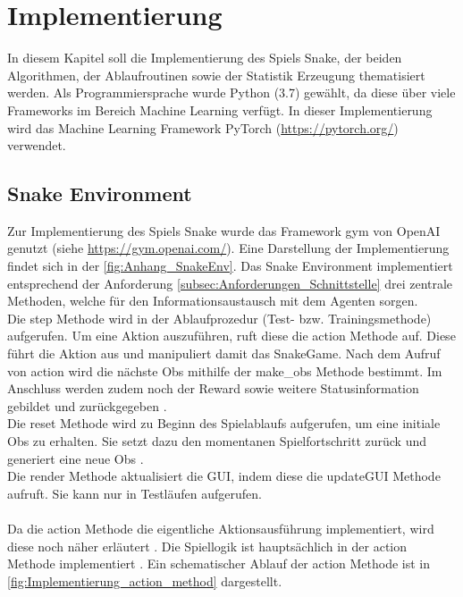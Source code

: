 \chapter{Implementierung} \label{chap:Implementierung}
In diesem Kapitel soll die Implementierung des Spiels Snake, der beiden Algorithmen, der Ablaufroutinen sowie der Statistik Erzeugung thematisiert werden. Als Programmiersprache wurde Python (3.7) gewählt, da diese über viele Frameworks im Bereich Machine Learning verfügt.
In dieser Implementierung wird das Machine Learning Framework PyTorch (\url{https://pytorch.org/}) verwendet.

\section{Snake Environment} \label{sec:Implementierung_Environment}
Zur Implementierung des Spiels Snake wurde das Framework gym von OpenAI genutzt (siehe \url{https://gym.openai.com/}). Eine Darstellung der Implementierung findet sich in der \autoref{fig:Anhang_SnakeEnv}. Das Snake Environment implementiert entsprechend der Anforderung \ref{subsec:Anforderungen_Schnittstelle} drei zentrale Methoden, welche für den Informationsaustausch mit dem Agenten sorgen.\\ 
Die step Methode  wird in der Ablaufprozedur (Test- bzw. Trainingsmethode) aufgerufen. Um eine Aktion auszuführen, ruft diese die action Methode auf. Diese führt die Aktion aus und manipuliert damit das SnakeGame.
Nach dem Aufruf von  action wird die nächste Obs mithilfe der make\_obs Methode bestimmt. Im Anschluss werden zudem noch der Reward sowie weitere Statusinformation gebildet und zurückgegeben .\\
Die reset Methode  wird zu Beginn des Spielablaufs aufgerufen, um eine initiale Obs zu erhalten. Sie setzt dazu den momentanen Spielfortschritt zurück und generiert eine neue Obs .\\
Die render Methode  aktualisiert die GUI, indem diese die updateGUI Methode aufruft. Sie kann nur in Testläufen aufgerufen.\\
\\Da die action Methode die eigentliche Aktionsausführung implementiert, wird diese noch näher erläutert .
Die Spiellogik ist hauptsächlich in der action Methode implementiert . Ein schematischer Ablauf der action Methode ist in \autoref{fig:Implementierung_action_method} dargestellt.
